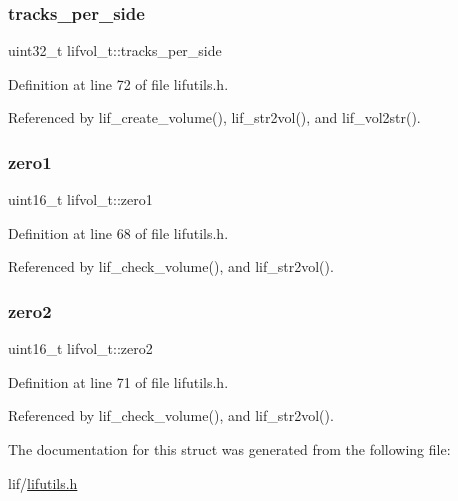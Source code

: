 \subsubsection{\texorpdfstring{tracks\+\_\+per\+\_\+side}{tracks\_per\_side}}
{\footnotesize\ttfamily uint32\+\_\+t lifvol\+\_\+t\+::tracks\+\_\+per\+\_\+side}



Definition at line 72 of file lifutils.\+h.



Referenced by lif\+\_\+create\+\_\+volume(), lif\+\_\+str2vol(), and lif\+\_\+vol2str().

\mbox{\label{structlifvol__t_a5e749ae4bff79deaa813966cff04f431}} 
\subsubsection{\texorpdfstring{zero1}{zero1}}
{\footnotesize\ttfamily uint16\+\_\+t lifvol\+\_\+t\+::zero1}



Definition at line 68 of file lifutils.\+h.



Referenced by lif\+\_\+check\+\_\+volume(), and lif\+\_\+str2vol().

\mbox{\label{structlifvol__t_ac05fef8e2c908110de7083d7afbfdb37}} 
\subsubsection{\texorpdfstring{zero2}{zero2}}
{\footnotesize\ttfamily uint16\+\_\+t lifvol\+\_\+t\+::zero2}



Definition at line 71 of file lifutils.\+h.



Referenced by lif\+\_\+check\+\_\+volume(), and lif\+\_\+str2vol().



The documentation for this struct was generated from the following file\+:\begin{DoxyCompactItemize}
\item 
lif/\hyperlink{lifutils_8h}{lifutils.\+h}\end{DoxyCompactItemize}
